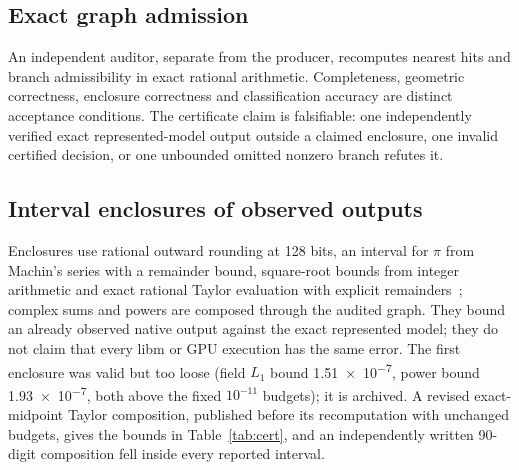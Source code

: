 \documentclass[11pt,a4paper]{article}
\begin{document}
\subsection{Exact graph admission}
An independent auditor, separate from the producer, recomputes nearest hits and branch admissibility in exact rational arithmetic. Completeness, geometric correctness, enclosure correctness and classification accuracy are distinct acceptance conditions. The certificate claim is falsifiable: one independently verified exact represented-model output outside a claimed enclosure, one invalid certified decision, or one unbounded omitted nonzero branch refutes it.

\subsection{Interval enclosures of observed outputs}
Enclosures use rational outward rounding at 128 bits, an interval for $\pi$ from Machin's series with a remainder bound, square-root bounds from integer arithmetic and exact rational Taylor evaluation with explicit remainders~\cite{moore2009}; complex sums and powers are composed through the audited graph. They bound an already observed native output against the exact represented model; they do not claim that every libm or GPU execution has the same error. The first enclosure was valid but too loose (field $L_1$ bound \num{1.51e-7}, power bound \num{1.93e-7}, both above the fixed $10^{-11}$ budgets); it is archived. A revised exact-midpoint Taylor composition, published before its recomputation with unchanged budgets, gives the bounds in Table~\ref{tab:cert}, and an independently written 90-digit composition fell inside every reported interval.
\end{document}
